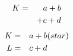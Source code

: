 \documentclass{article}
\begin{document}
\begin{eqnarray}
K &=& a + b
&\cr&&
+ c + d
\end{eqnarray}
\begin{eqnarray}
K &=& a + b & (star)\cr
L &=& c + d
\end{eqnarray}
\end{document}
